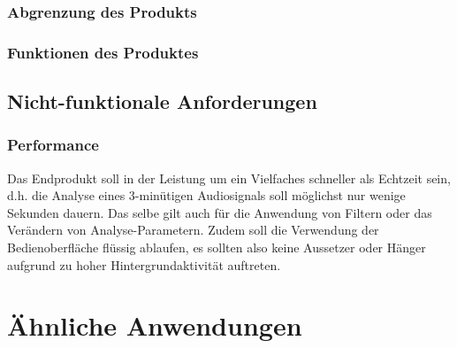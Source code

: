 \documentclass[a4paper]{article}
\begin{document}
\subsubsection{Abgrenzung des Produkts}
\subsubsection{Funktionen des Produktes}

\subsection{Nicht-funktionale Anforderungen}
\subsubsection{Performance}

Das Endprodukt soll in der Leistung um ein Vielfaches schneller als Echtzeit sein, d.h. die Analyse eines 3-minütigen Audiosignals soll möglichst nur wenige Sekunden dauern. Das selbe gilt auch für die Anwendung von Filtern oder das Verändern von Analyse-Parametern. Zudem soll die Verwendung der Bedienoberfläche flüssig ablaufen, es sollten also keine Aussetzer oder Hänger aufgrund zu hoher Hintergrundaktivität auftreten.


\newpage
\section{Ähnliche Anwendungen}
\end{document}
